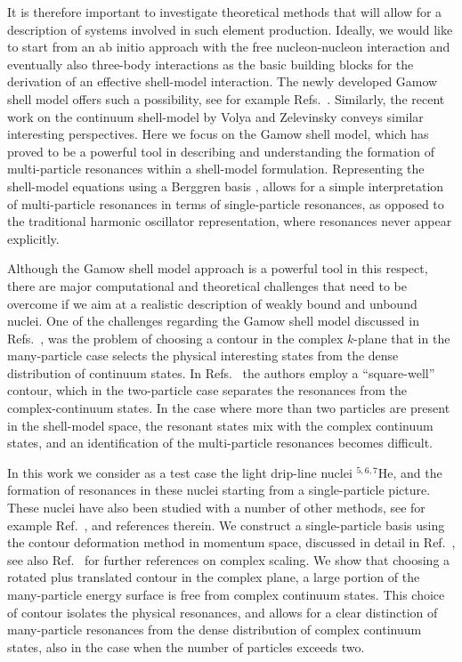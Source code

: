 It is therefore important to investigate theoretical methods that will allow
for a description of systems involved in such
element production.  Ideally, we would like to start from an ab initio 
approach  with the free nucleon-nucleon interaction and eventually also 
three-body interactions as the basic building
blocks for the derivation of an effective shell-model interaction. 
The newly developed Gamow shell model offers such a possibility, 
see for example 
Refs.~\cite{michel1,michel2,michel3,liotta,betan,witek1,witek2,roberto,betan2}.
Similarly, the recent work on the continuum shell-model by Volya and Zelevinsky
\cite{vz2003} conveys similar interesting perspectives. Here we focus on the 
Gamow shell model, which has proved 
to be a powerful tool in describing and understanding the formation of 
multi-particle resonances within a shell-model formulation. Representing
the shell-model equations using a  Berggren basis
\cite{berggren,berggren1,berggren2,berggren3,lind,hagen}, allows for a simple
interpretation of multi-particle resonances in terms of single-particle
resonances, as opposed to the traditional harmonic oscillator representation, where 
resonances never appear explicitly. 

Although the Gamow shell model approach is a powerful tool in this respect, there
are major computational and theoretical challenges that
need to be overcome if we aim at a realistic description 
of weakly bound and unbound nuclei. 
One of the challenges regarding the Gamow shell model 
discussed in Refs.~\cite{liotta, betan}, was
the problem of choosing a contour in the complex $k$-plane that 
in the many-particle case selects the physical interesting
states from the dense distribution of continuum states. 
In Refs.~\cite{liotta,betan}  the authors employ a ``square-well'' contour, which in the 
two-particle case separates the resonances from the complex-continuum 
states. In the case where more than two particles are present in the shell-model space, 
the resonant states mix  with the complex continuum states,
and an identification of the multi-particle resonances becomes difficult.

In this work we consider as a test case the light 
drip-line nuclei $^{5,6,7}$He, and the formation 
of resonances in these nuclei 
starting from a single-particle picture. These nuclei have also been 
studied with a number of other methods, see for example Ref.~\cite{jonson}, 
and references therein.
We  construct a single-particle basis using the contour deformation method 
in momentum space, discussed in detail in Ref.~\cite{hagen}, see also Ref.~\cite{nimrod}
for further references on complex scaling.
We show that choosing a rotated plus translated contour in the complex
plane, a large portion of the many-particle energy surface is free from
complex continuum states. This choice of contour isolates the physical resonances,
and allows for a clear distinction of many-particle resonances 
from the dense distribution 
of complex continuum states, also in the case when the number of particles 
exceeds two. 

